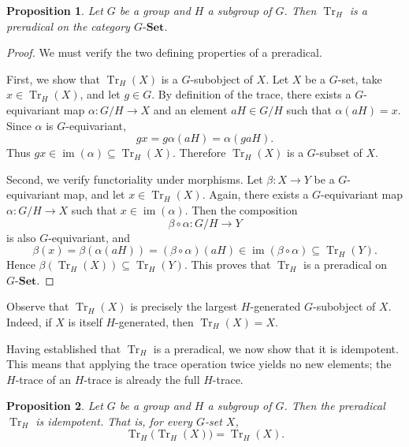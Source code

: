 \documentclass{amsart}
\newtheorem{proposition}{Proposition}
\begin{document}
\begin{proposition}\label{prop:tr_preradical}
Let $G$ be a group and $H$ a subgroup of $G$. Then $\operatorname{Tr}_H$ is a preradical on the category $G\text{-}\mathbf{Set}$.
\end{proposition}

\begin{proof}
We must verify the two defining properties of a preradical.

First, we show that $\operatorname{Tr}_H(X)$ is a $G$-subobject of $X$. Let $X$ be a $G$-set, take $x \in \operatorname{Tr}_H(X)$, and let $g \in G$. By definition of the trace, there exists a $G$-equivariant map $\alpha \colon G/H \longrightarrow X$ and an element $aH \in G/H$ such that $\alpha(aH) = x$. Since $\alpha$ is $G$-equivariant,
\[
g x = g \alpha(aH) = \alpha(g aH).
\]
Thus $g x \in \operatorname{im}(\alpha) \subseteq \operatorname{Tr}_H(X)$. Therefore $\operatorname{Tr}_H(X)$ is a $G$-subset of $X$.

Second, we verify functoriality under morphisms. Let $\beta \colon X \longrightarrow Y$ be a $G$-equivariant map, and let $x \in \operatorname{Tr}_H(X)$. Again, there exists a $G$-equivariant map $\alpha \colon G/H \longrightarrow X$ such that $x \in \operatorname{im}(\alpha)$. Then the composition
\[
\beta \circ \alpha \colon G/H \longrightarrow Y
\]
is also $G$-equivariant, and
\[
\beta(x) = \beta(\alpha(aH)) = (\beta \circ \alpha)(aH) \in \operatorname{im}(\beta \circ \alpha) \subseteq \operatorname{Tr}_H(Y).
\]
Hence $\beta(\operatorname{Tr}_H(X)) \subseteq \operatorname{Tr}_H(Y)$. This proves that $\operatorname{Tr}_H$ is a preradical on $G\text{-}\mathbf{Set}$.
\end{proof}

Observe that $\operatorname{Tr}_H(X)$ is precisely the largest $H$-generated $G$-subobject of $X$. Indeed, if $X$ is itself $H$-generated, then $\operatorname{Tr}_H(X) = X$.

Having established that $\operatorname{Tr}_H$ is a preradical, we now show that it is idempotent. This means that applying the trace operation twice yields no new elements; the $H$-trace of an $H$-trace is already the full $H$-trace.

\begin{proposition}\label{prop:tr_idempotent}
Let $G$ be a group and $H$ a subgroup of $G$. Then the preradical $\operatorname{Tr}_H$ is idempotent. That is, for every $G$-set $X$,
\[
\operatorname{Tr}_H\bigl(\operatorname{Tr}_H(X)\bigr) = \operatorname{Tr}_H(X).
\]
\end{proposition}
\end{document}

